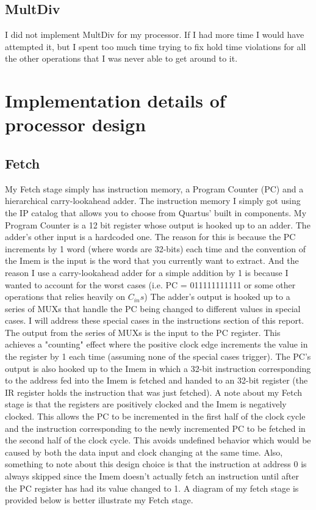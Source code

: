 \documentclass[letterpaper]{article} %
\begin{document}
       \FloatBarrier
    
\subsection{MultDiv}

    I did not implement MultDiv for my processor. If I had more time I would have attempted it, but I spent too much time trying to fix hold time violations for all the other operations that I was never able to get around to it. 
    
    
\section{Implementation details of processor design}

\subsection{Fetch}

    My Fetch stage simply has instruction memory, a Program Counter (PC) and a hierarchical carry-lookahead adder. The instruction memory I simply got using the IP catalog that allows you to choose from Quartus' built in components. My Program Counter is a 12 bit register whose output is hooked up to an adder. The adder's other input is a hardcoded one. The reason for this is because the PC increments by 1 word (where words are 32-bits) each time and the convention of the Imem is the input is the word that you currently want to extract. And the reason I use a carry-lookahead adder for a simple addition by 1 is because I wanted to account for the worst cases (i.e. PC = 011111111111 or some other operations that relies heavily on $C_{in}s$) The adder's output is hooked up to a series of MUXs that handle the PC being changed to different values in special cases. I will address these special cases in the instructions section of this report. The output from the series of MUXs is the input to the PC register. This achieves a "counting" effect where the positive clock edge increments the value in the register by 1 each time (assuming none of the special cases trigger). The PC's output is also hooked up to the Imem in which a 32-bit instruction corresponding to the address fed into the Imem is fetched and handed to an 32-bit register (the IR register holds the instruction that was just fetched). A note about my Fetch stage is that the registers are positively clocked and the Imem is negatively clocked. This allows the PC to be incremented in the first half of the clock cycle and the instruction corresponding to the newly incremented PC to be fetched in the second half of the clock cycle. This avoids undefined behavior which would be caused by both the data input and clock changing at the same time. Also, something to note about this design choice is that the instruction at address 0 is always skipped since the Imem doesn't actually fetch an instruction until after the PC register has had its value changed to 1. A diagram of my fetch stage is provided below is better illustrate my Fetch stage.
    
\end{document}
